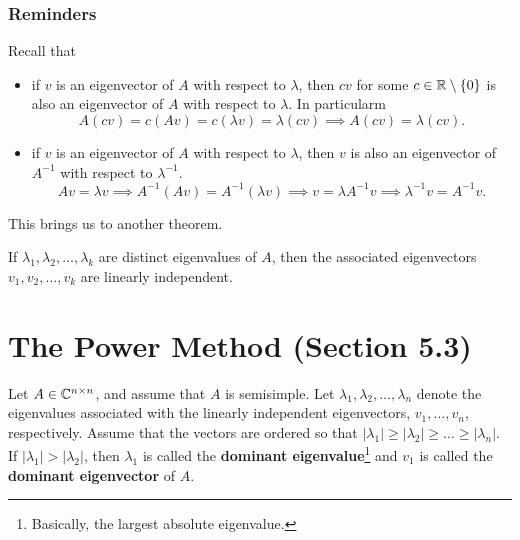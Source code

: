 \documentclass[letterpaper]{article}
\newcommand{\0}{\mathbf{0}}
\begin{document}
\subsubsection{Reminders}
Recall that 
\begin{itemize}
    \item if $v$ is an eigenvector of $A$ with respect to $\lambda$, then $cv$ for some $c \in \mathbb{R} \setminus \{0\}$ is also an eigenvector of $A$ with respect to $\lambda$. In particularm 
    \[A(cv) = c(Av) = c(\lambda v) = \lambda(cv) \implies A(cv) = \lambda(cv).\]

    \item if $v$ is an eigenvector of $A$ with respect to $\lambda$, then $v$ is also an eigenvector of $A^{-1}$ with respect to $\lambda^{-1}$. 
    \[Av = \lambda v \implies A^{-1}(Av) = A^{-1}(\lambda v) \implies v = \lambda A^{-1}v \implies \lambda^{-1} v = A^{-1} v.\]
\end{itemize}
This brings us to another theorem. 
\begin{theorem}{}{}
    If $\lambda_1, \lambda_2, \hdots, \lambda_k$ are distinct eigenvalues of $A$, then the associated eigenvectors $v_1, v_2, \hdots, v_k$ are linearly independent. 
\end{theorem}




\section{The Power Method (Section 5.3)}
Let $A \in \mathbb{C}^{n \times n}$, and assume that $A$ is semisimple. Let $\lambda_1, \lambda_2, \hdots, \lambda_n$ denote the eigenvalues associated with the linearly independent eigenvectors, $v_1, \hdots, v_n$, respectively. Assume that the vectors are ordered so that $|\lambda_1| \geq |\lambda_2| \geq \hdots \geq |\lambda_n|$. If $|\lambda_1| > |\lambda_2|$, then $\lambda_1$ is called the \textbf{dominant eigenvalue}\footnote{Basically, the largest absolute eigenvalue.} and $v_1$ is called the \textbf{dominant eigenvector} of $A$.  
\end{document}
